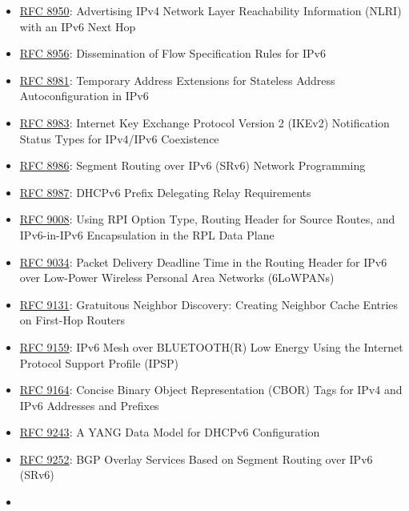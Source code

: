 \documentclass[
]{article}
\begin{document}
\begin{itemize}
  \href{https://www.rfc-editor.org/info/rfc8948}{RFC 8948}: Structured
  Local Address Plan (SLAP) Quadrant Selection Option for DHCPv6
\item
  \href{https://www.rfc-editor.org/info/rfc8950}{RFC 8950}: Advertising
  IPv4 Network Layer Reachability Information (NLRI) with an IPv6 Next
  Hop
\item
  \href{https://www.rfc-editor.org/info/rfc8956}{RFC 8956}:
  Dissemination of Flow Specification Rules for IPv6
\item
  \href{https://www.rfc-editor.org/info/rfc8981}{RFC 8981}: Temporary
  Address Extensions for Stateless Address Autoconfiguration in IPv6
\item
  \href{https://www.rfc-editor.org/info/rfc8983}{RFC 8983}: Internet Key
  Exchange Protocol Version 2 (IKEv2) Notification Status Types for
  IPv4/IPv6 Coexistence
\item
  \href{https://www.rfc-editor.org/info/rfc8986}{RFC 8986}: Segment
  Routing over IPv6 (SRv6) Network Programming
\item
  \href{https://www.rfc-editor.org/info/rfc8987}{RFC 8987}: DHCPv6
  Prefix Delegating Relay Requirements
\item
  \href{https://www.rfc-editor.org/info/rfc9008}{RFC 9008}: Using RPI
  Option Type, Routing Header for Source Routes, and IPv6-in-IPv6
  Encapsulation in the RPL Data Plane
\item
  \href{https://www.rfc-editor.org/info/rfc9034}{RFC 9034}: Packet
  Delivery Deadline Time in the Routing Header for IPv6 over Low-Power
  Wireless Personal Area Networks (6LoWPANs)
\item
  \href{https://www.rfc-editor.org/info/rfc9131}{RFC 9131}: Gratuitous
  Neighbor Discovery: Creating Neighbor Cache Entries on First-Hop
  Routers
\item
  \href{https://www.rfc-editor.org/info/rfc9159}{RFC 9159}: IPv6 Mesh
  over BLUETOOTH(R) Low Energy Using the Internet Protocol Support
  Profile (IPSP)
\item
  \href{https://www.rfc-editor.org/info/rfc9164}{RFC 9164}: Concise
  Binary Object Representation (CBOR) Tags for IPv4 and IPv6 Addresses
  and Prefixes
\item
  \href{https://www.rfc-editor.org/info/rfc9243}{RFC 9243}: A YANG Data
  Model for DHCPv6 Configuration
\item
  \href{https://www.rfc-editor.org/info/rfc9252}{RFC 9252}: BGP Overlay
  Services Based on Segment Routing over IPv6 (SRv6)
\item

\end{itemize}
\end{document}
